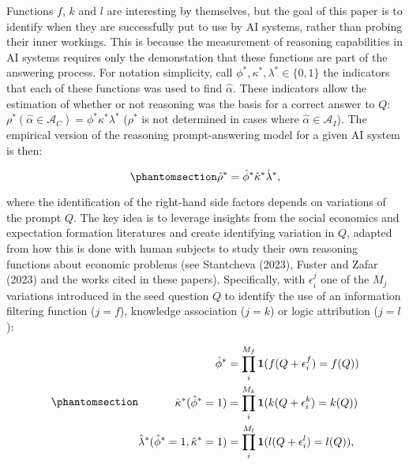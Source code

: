 \documentclass[
]{article}
\begin{document}
Functions \(f\), \(k\) and \(l\) are interesting by themselves, but the
goal of this paper is to identify when they are successfully put to use
by AI systems, rather than probing their inner workings. This is because
the measurement of reasoning capabilities in AI systems requires only
the demonstation that these functions are part of the answering process.
For notation simplicity, call
\(\phi^*, \kappa^*, \lambda^* \in \{0, 1\}\) the indicators that each of
these functions was used to find \(\hat{\alpha}\). These indicators
allow the estimation of whether or not reasoning was the basis for a
correct answer to \(Q\):
\(\rho^*(\hat{\alpha} \in \mathcal{A}_C) = \phi^* \kappa^* \lambda^*\)
(\(\rho^*\) is not determined in cases where
\(\hat{\alpha} \in \mathcal{A}_I\)). The empirical version of the
reasoning prompt-answering model for a given AI system is then:

\begin{equation}\phantomsection\label{eq-empiric}{
\hat{\rho}^* = \hat{\phi}^* \hat{\kappa}^* \hat{\lambda}^*,
}\end{equation}

where the identification of the right-hand side factors depends on
variations of the prompt \(Q\). The key idea is to leverage insights
from the social economics and expectation formation literatures and
create identifying variation in \(Q\), adapted from how this is done
with human subjects to study their own reasoning functions about
economic problems (see Stantcheva (2023), Fuster and Zafar (2023) and
the works cited in these papers). Specifically, with \(\epsilon_i^j\)
one of the \(M_j\) variations introduced in the seed question \(Q\) to
identify the use of an information filtering function (\(j=f\)),
knowledge association (\(j=k\)) or logic attribution (\(j=l\)):

\begin{equation}\phantomsection\label{eq-empiricsyst}{
\begin{aligned}
\hat{\phi}^* &= \prod_{i}^{M_f} \mathbf{1}(f(Q + \epsilon_i^f) = f(Q)) \\
\hat{\kappa}^*(\hat{\phi}^*=1) &= \prod_{i}^{M_k} \mathbf{1}(k(Q + \epsilon_i^k) = k(Q)) \\
\hat{\lambda}^*(\hat{\phi}^* =1,\hat{\kappa}^*=1) &= \prod_{i}^{M_l} \mathbf{1}(l(Q + \epsilon_i^l) = l(Q)),
\end{aligned}
}\end{equation}
\end{document}
